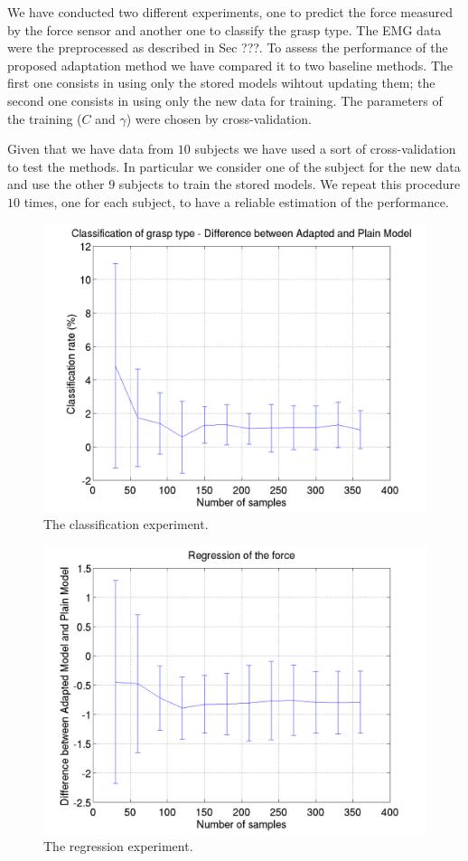 We have conducted two different experiments, one to predict the force measured
by the force sensor and another one to classify the grasp type.
The EMG data were the preprocessed as described in Sec ???.
To assess the performance of the proposed adaptation method we have compared it
to two baseline methods. The first one consists in using only the stored models
wihtout updating them; the second one consists in using only the new data for
training. The parameters of the training ($C$ and $\gamma$) were chosen by
cross-validation.

Given that we have data from $10$ subjects we have used a sort of
cross-validation to test the methods. In particular we consider one of the
subject for the new data and use the other $9$ subjects to train the stored
models. We repeat this procedure $10$ times, one for each subject, to have a
reliable estimation of the performance.

\begin{figure}[t]
  \centering
  \includegraphics[width=0.95\linewidth]{figs/exp1}
  \caption{The classification experiment.}
  \label{fig:exp1}
\end{figure}

\begin{figure}[t]
  \centering
  \includegraphics[width=0.95\linewidth]{figs/exp2}
  \caption{The regression experiment.}
  \label{fig:exp2}
\end{figure}